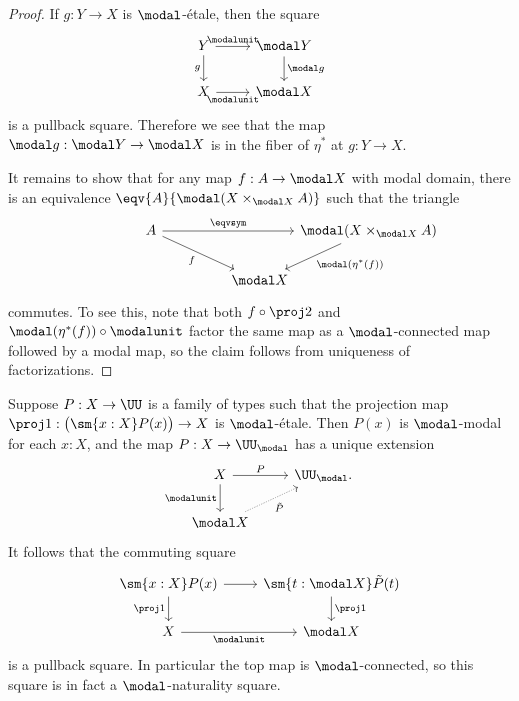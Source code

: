 \documentclass{msc}
\begin{document}
\begin{proof}
If $g:Y\to X$ is $\modal$-\'etale, then the square
\begin{equation*}
\begin{tikzcd}
Y \arrow[d,swap,"g"] \arrow[r,"\modalunit"] & \modal Y \arrow[d,"\modal g"] \\
X \arrow[r,swap,"\modalunit"] & \modal X
\end{tikzcd}
\end{equation*}
is a pullback square. Therefore we see that the map $\modal g : \modal Y \to \modal X$ is in the fiber of $\eta^\ast$ at $g : Y\to X$. 

It remains to show that for any map $f:A\to\modal X$ with modal domain, there is an equivalence $\eqv{A}{\modal (X\times_{\modal X} A)}$ such that the triangle
\begin{equation*}
\begin{tikzcd}[column sep=0]
A \arrow[dr,swap,"f"] \arrow[rr,"\eqvsym"] & & \modal (X\times_{\modal X} A) \arrow[dl,"\modal(\eta^\ast(f))"] \\
\phantom{\modal (X\times_{\modal X} A)} & \modal X
\end{tikzcd}
\end{equation*}
commutes. To see this, note that both $f\circ \proj 2$ and $\modal(\eta^\ast(f))\circ \modalunit$ factor the same map as a $\modal$-connected map followed by a modal map, so the claim follows from uniqueness of factorizations.
\end{proof}

\begin{cor}
Suppose $P:X\to\UU$ is a family of types such that the projection map $\proj 1:\big(\sm{x:X}P(x)\big)\to X$ is $\modal$-\'etale. Then $P(x)$ is $\modal$-modal for each $x:X$, and the map $P:X\to\UU_\modal$ has a unique extension
\begin{equation*}
\begin{tikzcd}
X \arrow[d,swap,"\modalunit"] \arrow[r,"P"] & \UU_\modal. \\
\modal X \arrow[ur,densely dotted,swap,"\tilde{P}"] 
\end{tikzcd}
\end{equation*}
It follows that the commuting square
\begin{equation*}
\begin{tikzcd}
\sm{x:X}P(x) \arrow[d,swap,"\proj 1"] \arrow[r] & \sm{t:\modal X}\tilde{P}(t) \arrow[d,"\proj 1"] \\
X \arrow[r,swap,"\modalunit"] & \modal X
\end{tikzcd}
\end{equation*}
is a pullback square. In particular the top map is $\modal$-connected, so this square is in fact a $\modal$-naturality square.
\end{cor}
\end{document}
